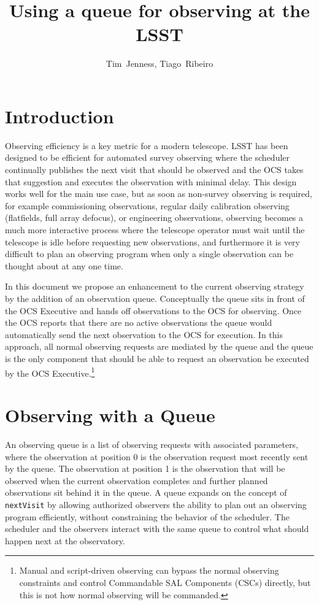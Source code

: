 \documentclass[TS,toc,lsstdraft]{lsstdoc}
\title{Using a queue for observing at the LSST}
\author         {Tim~Jenness, Tiago~Ribeiro}                %
\begin{document}
%
%
\maketitle


\section{Introduction}

Observing efficiency is a key metric for a modern telescope.
LSST has been designed to be efficient for automated survey observing where the scheduler continually publishes the next visit that should be observed and the OCS takes that suggestion and executes the observation with minimal delay.
This design works well for the main use case, but as soon as non-survey observing is required, for example commissioning observations, regular daily calibration observing (flatfields, full array defocus), or engineering observations, observing becomes a much more interactive process where the telescope operator must wait until the telescope is idle before requesting new observations, and furthermore it is very difficult to plan an observing program when only a single observation can be thought about at any one time.

In this document we propose an enhancement to the current observing strategy by the addition of an observation queue.
Conceptually the queue sits in front of the OCS Executive and hands off observations to the OCS for observing.
Once the OCS reports that there are no active observations the queue would automatically send the next observation to the OCS for execution.
In this approach, all normal observing requests are mediated by the queue and the queue is the only component that should be able to request an observation be executed by the OCS Executive.\footnote{Manual and script-driven observing can bypass the normal observing constraints and control Commandable SAL Components (CSCs) directly, but this is not how normal observing will be commanded.}


\section{Observing with a Queue}

An observing queue is a list of observing requests with associated parameters, where the observation at position 0 is the observation request most recently sent by the queue.
The observation at position 1 is the observation that will be observed when the current observation completes and further planned observations sit behind it in the queue.
A queue expands on the concept of \texttt{nextVisit} by allowing authorized observers the ability to plan out an observing program efficiently, without constraining the behavior of the scheduler.
The scheduler and the observers interact with the same queue to control what should happen next at the observatory.
\end{document}
